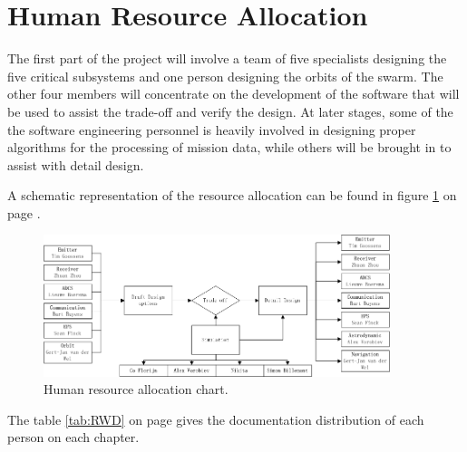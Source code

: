 \section{Human Resource Allocation}
\label{DDHR}
The first part of the project will involve a team of five specialists designing the five critical subsystems and one person designing the orbits of the swarm. The other four members will concentrate on the development of the software that will be used to assist the trade-off and verify the design. At later stages, some of the the software engineering personnel is heavily involved in designing proper algorithms for the processing of mission data, while others will be brought in to assist with detail design. 

A schematic representation of the resource allocation can be found in figure \ref{fig:DDBBHR} on page \pageref{fig:DDBBHR}.

\begin{figure}[h!]
\begin{center}
\includegraphics[width=0.9\textwidth]{chapters/img/DDBBHR.jpg}
\end{center}
\caption{Human resource allocation chart.}
\label{fig:DDBBHR}
\end{figure}

The table \ref{tab:RWD} on page \pageref{tab:RWD} gives the documentation distribution of each person on each chapter.

